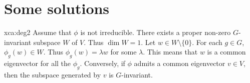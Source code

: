 \chapter*{Some solutions}

\pagestyle{plain}
\fancyhf{}
\fancyfoot[CE,CO]{\leftmark}
\fancyfoot[LE,RO]{\thepage}


\begin{sol}{xca:deg2}
  Assume that $\phi$ is not irreducible. There exists a proper non-zero $G$-invariant 
  subspace $W$ of $V$. Thus $\dim W=1$. Let $w\in W\setminus\{0\}$.
  For each $g\in G$, $\phi_g(w)\in W$. Thus $\phi_g(w)=\lambda w$ for some 
  $\lambda$. This means that $w$ is a common eigenvector for all the $\phi_g$.
  Conversely, if $\phi$ admits a common eigenvector $v\in V$, then 
  the subspace generated by $v$ is $G$-invariant.
\end{sol}